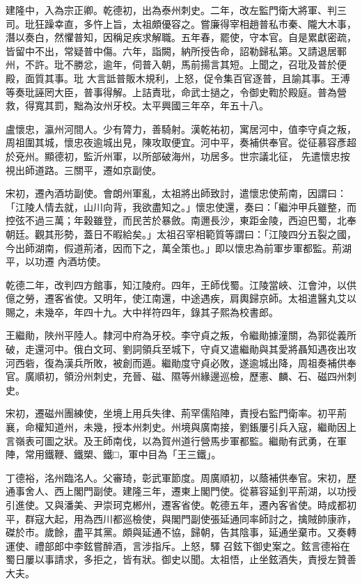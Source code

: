 \begin{pinyinscope}
 建隆中，入為宗正卿。乾德初，出為泰州刺史。二年，改左監門衛大將軍、判三司。玭狂躁幸直，多忤上旨，太祖頗優容之。嘗廉得宰相趙普私市秦、隴大木事，潛以奏白，然懼普知，因稱足疾求解職。五年春，罷使，守本官。自是累獻密疏，皆留中不出，常疑普中傷。六年，詣闕，納所授告命，詔勒歸私第。又請退居鄆州，不許。玭不勝忿，逾年，伺普入朝，馬前揚言其短。上聞之，召玭及普於便殿，面質其事。玭
 大言詆普販木規利，上怒，促令集百官逐普，且諭其事。王溥等奏玭誣罔大臣，普事得解。上詰責玭，命武士撾之，令御史鞫於殿庭。普為營救，得寬其罰，黜為汝州牙校。太平興國三年卒，年五十八。



 盧懷忠，瀛州河間人。少有膂力，善騎射。漢乾祐初，寓居河中，值李守貞之叛，周祖圍其城，懷忠夜逾城出見，陳攻取便宜。河中平，奏補供奉官。從征慕容彥超於兗州。顯德初，監沂州軍，以所部破海州，功居多。世宗議北征，
 先遣懷忠按視出師道路。三關平，遷如京副使。



 宋初，遷內酒坊副使。會朗州軍亂，太祖將出師致討，遣懷忠使荊南，因謂曰：「江陵人情去就，山川向背，我欲盡知之。」懷忠使還，奏曰：「繼沖甲兵雖整，而控弦不過三萬；年穀雖登，而民苦於暴斂。南邇長沙，東距金陵，西迫巴蜀，北奉朝廷。觀其形勢，蓋日不暇給矣。」太祖召宰相範質等謂曰：「江陵四分五裂之國，今出師湖南，假道荊渚，因而下之，萬全策也。」即以懷忠為前軍步軍都監。荊湖平，以功遷
 內酒坊使。



 乾德二年，改判四方館事，知江陵府。四年，王師伐蜀。江陵當峽、江會沖，以供億之勞，遷客省使。又明年，使江南還，中途遇疾，肩輿歸京師。太祖遣醫丸艾以賜之，未幾卒，年四十九。大中祥符四年，錄其子熙為校書郎。



 王繼勛，陜州平陸人。隸河中府為牙校。李守貞之叛，令繼勛據潼關，為郭從義所破，走還河中。俄白文珂、劉詞領兵至城下，守貞又遣繼勛與其愛將聶知遇夜出攻
 河西砦，復為漢兵所敗，被創而遁。繼勛度守貞必敗，遂逾城出降，周祖奏補供奉官。廣順初，領汾州刺史，充晉、磁、隰等州緣邊巡檢，歷憲、麟、石、磁四州刺史。



 宋初，遷磁州團練使，坐境上用兵失律、荊罕儒陷陣，責授右監門衛率。初平荊襄，命權知道州，未幾，授本州刺史。州境與廣南接，劉鋹屢引兵入寇，繼勛因上言嶺表可圖之狀。及王師南伐，以為賀州道行營馬步軍都監。繼勛有武勇，在軍陣，常用鐵鞭、鐵槊、鐵□，軍中目為「王三鐵」。



 丁德裕，洺州臨洺人。父審琦，彰武軍節度。周廣順初，以蔭補供奉官。宋初，歷通事舍人、西上閣門副使。建隆三年，遷東上閣門使。從慕容延釗平荊湖，以功授引進使。又與潘美、尹崇珂克郴州，遷客省使。乾德五年，遷內客省使。時成都初平，群寇大起，用為西川都巡檢使，與閣門副使張延通同率師討之，擒賊帥康祚，磔於市。歲餘，盡平其黨。頗與延通不協，歸朝，告其陰事，延通坐棄市。又奏轉運使、禮部郎中李鉉嘗醉酒，言涉指斥。上怒，驛
 召鉉下御史案之。鉉言德裕在蜀日屢以事請求，多拒之，皆有狀。御史以聞。太祖悟，止坐鉉酒失，責授左贊善大夫。




\end{pinyinscope}
